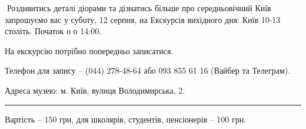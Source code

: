 📍Роздивитись деталі діорами та дізнатись більше про середньовічний Київ
запрошуємо вас у суботу, 12 серпня, на Екскурсія вихідного дня: Київ 10-13
століть. Початок о о 14:00.

На екскурсію потрібно попередньо записатися.

Телефон для запису – (044) 278-48-64 або 093 855 61 16 (Вайбер та Телеграм).

Адреса музею: м. Київ, вулиця Володимирська, 2.

\par\noindent\rule{\textwidth}{0.4pt}

Вартість – 150 грн, для школярів, студентів, пенсіонерів – 100 грн.
